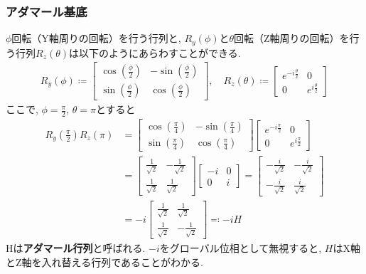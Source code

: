 \documentclass[9pt]{beamer}
\begin{document}
\begin{frame}
  \frametitle{アダマール基底}
  $\phi$回転（Y軸周りの回転）を行う行列と, $R_y(\phi)$と$\theta$回転（Z軸周りの回転）を行う行列$R_z(\theta)$は以下のようにあらわすことができる.
  \begin{align}
    R_y(\phi) \coloneq \begin{bmatrix}
      \cos \left( \frac{\phi}{2} \right) & -\sin \left( \frac{\phi}{2} \right) \\
      \sin \left( \frac{\phi}{2} \right) & \cos \left( \frac{\phi}{2} \right)
    \end{bmatrix}, \quad
    R_z(\theta) \coloneq \begin{bmatrix}
      e^{-i\frac{\theta}{2}} & 0 \\
      0 & e^{i\frac{\theta}{2}}
    \end{bmatrix}
  \end{align}
  ここで, $\phi = \frac{\pi}{2}$, $\theta = \pi$とすると
  \begin{align}
    R_y \left( \frac{\pi}{2} \right) R_z(\pi) &= \begin{bmatrix}
      \cos \left( \frac{\pi}{4} \right) & -\sin \left( \frac{\pi}{4} \right) \\
      \sin \left( \frac{\pi}{4} \right) & \cos \left( \frac{\pi}{4} \right)
      \end{bmatrix}
      \begin{bmatrix}
      e^{-i\frac{\pi}{2}} & 0 \\
      0 & e^{i\frac{\pi}{2}}
    \end{bmatrix} \\
    &= \begin{bmatrix}
      \frac{1}{\sqrt{2}} & -\frac{1}{\sqrt{2}} \\
      \frac{1}{\sqrt{2}} & \frac{1}{\sqrt{2}}
    \end{bmatrix}
    \begin{bmatrix}
      -i & 0 \\
      0 & i
    \end{bmatrix}
    = \begin{bmatrix}
      -\frac{i}{\sqrt{2}} & -\frac{i}{\sqrt{2}} \\
      -\frac{i}{\sqrt{2}} & \frac{i}{\sqrt{2}}
    \end{bmatrix} \\
    &= -i \begin{bmatrix}
      \frac{1}{\sqrt{2}} & \frac{1}{\sqrt{2}} \\
      \frac{1}{\sqrt{2}} & -\frac{1}{\sqrt{2}}
    \end{bmatrix}
    \eqqcolon -i H
    \end{align}
    Hは\textbf{アダマール行列}と呼ばれる. $-i$をグローバル位相として無視すると, $H$はX軸とZ軸を入れ替える行列であることがわかる.

\end{frame}
\end{document}
